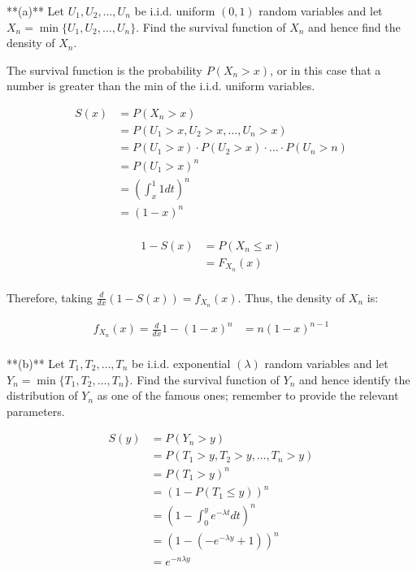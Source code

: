 \documentclass{report}
\begin{document}
**(a)** Let $U_1, U_2, \ldots, U_n$ be i.i.d. uniform $(0, 1)$ random variables and let $X_n = \min\{U_1, U_2, \ldots, U_n\}$. Find the survival function of $X_n$ and hence find the density of $X_n$.

The survival function is the probability $ P(X_{n} > x) $, or in this case that a number is greater than the min of the i.i.d. uniform variables. 


\begin{align*}
	S(x) &= P(X_{n} > x) \\
	&= P(U_1 > x, U_2 > x, \dots, U_{n} > x) \\	
	&= P(U_1 > x) \cdot P(U_2 > x) \cdot \dots \cdot P(U_{n} > n) \\
	&= P(U_1 > x)^{n} \\
	&= \left( \int_{x}^{1} 1 dt\right)^{n} \\
	&= (1-x)^{n} \\
\end{align*}


\begin{align*}
	1- S(x) &=  P(X_{n} \le x) \\
	&= F_{X_{n}}(x) \\
\end{align*}

Therefore, taking $ \frac{d}{dx} ( 1-S(x)) = f_{X_{n}}(x) $. 
Thus, the density of $ X_{n} $ is: 

\begin{align*}
f_{X_{n}}(x) =	\frac{d}{dx} 1 - (1-x)^{n} &= n(1-x)^{n-1} \\
\end{align*}

**(b)** Let $T_1, T_2, \ldots, T_n$ be i.i.d. exponential $(\lambda)$ random variables and let $Y_n = \min\{T_1, T_2, \ldots, T_n\}$. Find the survival function of $Y_n$ and hence identify the distribution of $Y_n$ as one of the famous ones; remember to provide the relevant parameters.


\begin{align*}
	S(y) &= P(Y_{n} > y) \\
	&= P(T_1 > y, T_2 > y, \dots, T_{n} > y) \\
	&= P(T_{1} > y)^{n} \\
	&= (1-P(T_{1} \le y))^{n} \\
	&= \left( 1- \int_{0}^{y}  e^{-\lambda t}dt \right)^{n}  \\
	&= \left( 1- (-e^{-\lambda y}  + 1)  \right)^{n}  \\
	&=  e^{-n\lambda y}\\
\end{align*}
\end{document}
